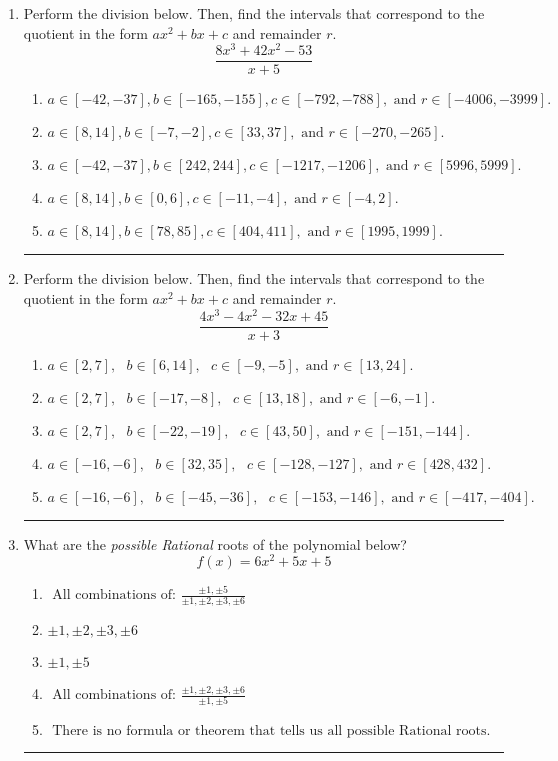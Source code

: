 \documentclass[14pt]{extbook}
\newcommand{\litem}[1]{\item#1\hspace*{-1cm}\rule{\textwidth}{0.4pt}}
\begin{document}
\begin{enumerate}
{\begin{enumerate}[label=\Alph*.]
\end{enumerate} }
\litem{
Perform the division below. Then, find the intervals that correspond to the quotient in the form $ax^2+bx+c$ and remainder $r$.\[ \frac{8x^{3} +42 x^{2} -53}{x + 5} \]\begin{enumerate}[label=\Alph*.]
\item \( a \in [-42, -37], b \in [-165, -155], c \in [-792, -788], \text{ and } r \in [-4006, -3999]. \)
\item \( a \in [8, 14], b \in [-7, -2], c \in [33, 37], \text{ and } r \in [-270, -265]. \)
\item \( a \in [-42, -37], b \in [242, 244], c \in [-1217, -1206], \text{ and } r \in [5996, 5999]. \)
\item \( a \in [8, 14], b \in [0, 6], c \in [-11, -4], \text{ and } r \in [-4, 2]. \)
\item \( a \in [8, 14], b \in [78, 85], c \in [404, 411], \text{ and } r \in [1995, 1999]. \)

\end{enumerate} }
\litem{
Perform the division below. Then, find the intervals that correspond to the quotient in the form $ax^2+bx+c$ and remainder $r$.\[ \frac{4x^{3} -4 x^{2} -32 x + 45}{x + 3} \]\begin{enumerate}[label=\Alph*.]
\item \( a \in [2, 7], \text{   } b \in [6, 14], \text{   } c \in [-9, -5], \text{   and   } r \in [13, 24]. \)
\item \( a \in [2, 7], \text{   } b \in [-17, -8], \text{   } c \in [13, 18], \text{   and   } r \in [-6, -1]. \)
\item \( a \in [2, 7], \text{   } b \in [-22, -19], \text{   } c \in [43, 50], \text{   and   } r \in [-151, -144]. \)
\item \( a \in [-16, -6], \text{   } b \in [32, 35], \text{   } c \in [-128, -127], \text{   and   } r \in [428, 432]. \)
\item \( a \in [-16, -6], \text{   } b \in [-45, -36], \text{   } c \in [-153, -146], \text{   and   } r \in [-417, -404]. \)

\end{enumerate} }
\litem{
What are the \textit{possible Rational} roots of the polynomial below?\[ f(x) = 6x^{2} +5 x + 5 \]\begin{enumerate}[label=\Alph*.]
\item \( \text{ All combinations of: }\frac{\pm 1,\pm 5}{\pm 1,\pm 2,\pm 3,\pm 6} \)
\item \( \pm 1,\pm 2,\pm 3,\pm 6 \)
\item \( \pm 1,\pm 5 \)
\item \( \text{ All combinations of: }\frac{\pm 1,\pm 2,\pm 3,\pm 6}{\pm 1,\pm 5} \)
\item \( \text{ There is no formula or theorem that tells us all possible Rational roots.} \)

\end{enumerate} }
\end{enumerate}
\end{document}
